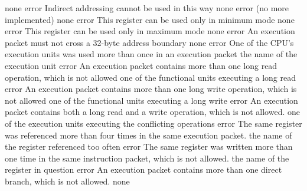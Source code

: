 \documentclass[12pt,twoside]{report}
\begin{document}
\begin{description}
               {none}
               {error}
               {Indirect addressing cannot be used in this way}
               {none}
               {error}
               {(no more implemented)}
               {none}
               {error}
               {This register can be used only in minimum mode}
               {none}
               {error}
               {This register can be used only in maximum mode}
               {none}
               {error}
               {An execution packet must not cross a 32-byte address
                boundary}
               {none}
               {error}
               {One of the CPU's execution units was used more than
                once in an execution packet}
               {the name of the execution unit}
               {error}
               {An execution packet contains more than one long read
                operation, which is not allowed}
               {one of the functional units executing a long read}
               {error}
               {An execution packet contains more than one long write
                operation, which is not allowed}
               {one of the functional units executing a long write}
               {error}
               {An execution packet contains both a long read and a write
                operation, which is not allowed.}
               {one of the execution units executing the conflicting
                operations}
               {error}
               {The same register was referenced more than four times in
                the same execution packet.}
               {the name of the register referenced too often}
               {error}
               {The same register was written more than one time in the
                same instruction packet, which is not allowed.}
               {the name of the register in question}
               {error}
               {An execution packet contains more than one direct branch,
                which is not allowed.}
               {none}

\end{description}
\end{document}

